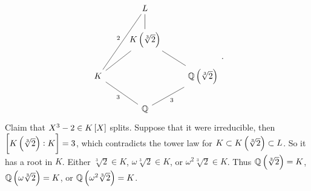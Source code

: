 $$
\begin{tikzcd}
& L & \\
& K\br{\sqrt[3]{2}} \arrow[dash]{u} & \\
K \arrow[dash]{uur}{2} \arrow[dash]{ur} & & \QQ\br{\sqrt[3]{2}} \arrow[dash]{ul} \\
& \QQ \arrow[dash]{ul}{3} \arrow[dash]{ur}[swap]{3} &
\end{tikzcd}.
$$
Claim that $ X^3 - 2 \in K\sbr{X} $ splits. Suppose that it were irreducible, then $ \sbr{K\br{\sqrt[3]{2}} : K} = 3 $, which contradicts the tower law for $ K \subset K\br{\sqrt[3]{2}} \subset L $. So it has a root in $ K $. Either $ \sqrt[3]{2} \in K $, $ \omega\sqrt[3]{2} \in K $, or $ \omega^2\sqrt[3]{2} \in K $. Thus $ \QQ\br{\sqrt[3]{2}} = K $, $ \QQ\br{\omega\sqrt[3]{2}} = K $, or $ \QQ\br{\omega^2\sqrt[3]{2}} = K $.

\pagebreak


